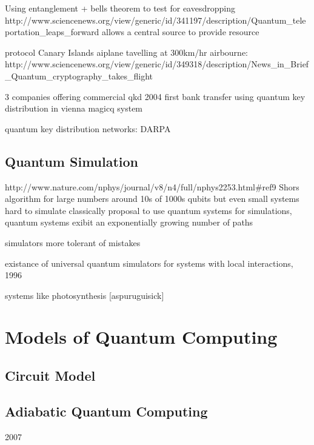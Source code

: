 Using entanglement + bells theorem \cite{bells_theorem} to test for eavesdropping
http://www.sciencenews.org/view/generic/id/341197/description/Quantum_teleportation_leaps_forward
\cite{ekert_91} allows a central source to provide resource
\cite{quantum_crypt_review}

\cite{quantum_repeaters} protocol
\cite{entanglement_97km_08}
\cite{entanglement_144km_07} Canary Islands
\cite{qkd_airbourne_13} aiplane tavelling at 300km/hr
airbourne: http://www.sciencenews.org/view/generic/id/349318/description/News_in_Brief_Quantum_cryptography_takes_flight

3 companies offering commercial qkd
2004 first bank transfer using quantum key distribution in vienna \cite{qkd_bank_transfer_04}
\cite{idquant_qkd_system} \cite{magiq_qkd_system}
\cite{qkd_blinding_attack}
magicq system

quantum key distribution networks: DARPA
\cite{secoqc_network}
\cite{tokyo_qkd_network}


\subsection{Quantum Simulation}
http://www.nature.com/nphys/journal/v8/n4/full/nphys2253.html#ref9
\cite{simulation_ion_review} Shors algorithm for large numbers around 10s of 1000s qubits
but even small systems hard to simulate classically
\cite{feynman_82} proposal to use quantum systems for simulations, quantum systems exibit an exponentially growing number of paths

simulators more tolerant of mistakes

\cite{lloyd_universal_simulators} existance of universal quantum simulators for systems with local interactions, 1996

systems like photosynthesis [aspuruguisick]

\section{Models of Quantum Computing}

\subsection{Circuit Model}

\subsection{Adiabatic Quantum Computing}
\cite{adiabatic_equivalent} 2007

